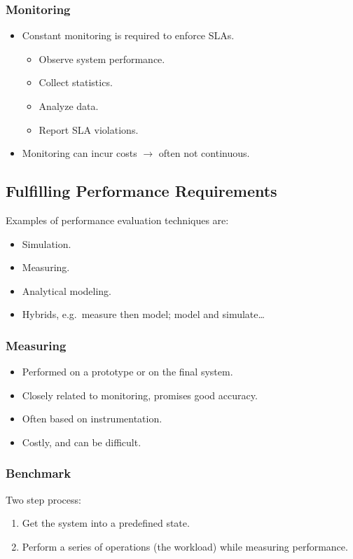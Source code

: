 \documentclass[11pt]{article}
\begin{document}
\subsubsection{Monitoring}
\begin{itemize}
  \item Constant monitoring is required to enforce SLAs.
    \begin{itemize}
      \item Observe system performance.
      \item Collect statistics.
      \item Analyze data.
      \item Report SLA violations.
    \end{itemize}
  \item Monitoring can incur costs $\rightarrow$ often not continuous.
\end{itemize}

\subsection{Fulfilling Performance Requirements}
Examples of performance evaluation techniques are:
\begin{itemize}
  \item Simulation.
  \item Measuring.
  \item Analytical modeling.
  \item Hybrids, e.g.\ measure then model; model and simulate\dots
\end{itemize}

\subsubsection{Measuring}
\begin{itemize}
  \item Performed on a prototype or on the final system.
  \item Closely related to monitoring, promises good accuracy.
  \item Often based on instrumentation.
  \item Costly, and can be difficult.
\end{itemize}

\subsubsection{Benchmark}
Two step process:
\begin{enumerate}
  \item Get the system into a predefined state.
  \item Perform a series of operations (the workload) while measuring performance.
\end{enumerate}
\end{document}
